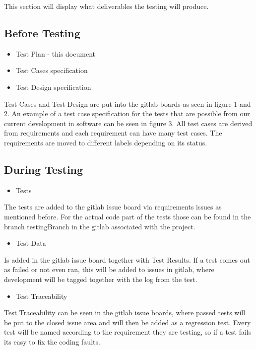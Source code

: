 
This section will display what deliverables the testing will produce.

\subsection{Before Testing}
\begin{itemize}
    \item Test Plan - this document
    \item{Test Cases specification}
    \item{Test Design specification}
\end{itemize}
Test Cases and Test Design are put into the gitlab boards as seen in figure 1 and 2. An example of a test case specification for the tests that are possible from our current development in software can be seen in figure 3. All test cases are derived from requirements and each requirement can have many test cases. The requirements are moved to different labels depending on its status.  




\subsection{During Testing}
\begin{itemize}
    \item Tests
\end{itemize}
The tests are added to the gitlab issue board via requirements issues as mentioned before. For the actual code part of the tests those can be found in the branch testingBranch in the gitlab associated with the project. 
\begin{itemize}
    
    \item{Test Data}
\end{itemize}
Is added in the gitlab issue board together with Test Results. If a test comes out as failed or not even ran, this will be added to issues in gitlab, where development will be tagged together with the log from the test.
\begin{itemize}

    \item{Test Traceability}
\end{itemize}
Test Traceability can be seen in the gitlab issue boards, where passed tests will be put to the closed issue area and will then be added as a regression test. Every test will be named according to the requirement they are testing, so if a test fails its easy to fix the coding faults.

